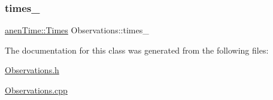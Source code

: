\subsubsection{\texorpdfstring{times\+\_\+}{times\_}}
{\footnotesize\ttfamily \mbox{\hyperlink{classanen_time_1_1_times}{anen\+Time\+::\+Times}} Observations\+::times\+\_\+\hspace{0.3cm}{\ttfamily [protected]}}



The documentation for this class was generated from the following files\+:\begin{DoxyCompactItemize}
\item 
\mbox{\hyperlink{_observations_8h}{Observations.\+h}}\item 
\mbox{\hyperlink{_observations_8cpp}{Observations.\+cpp}}\end{DoxyCompactItemize}
